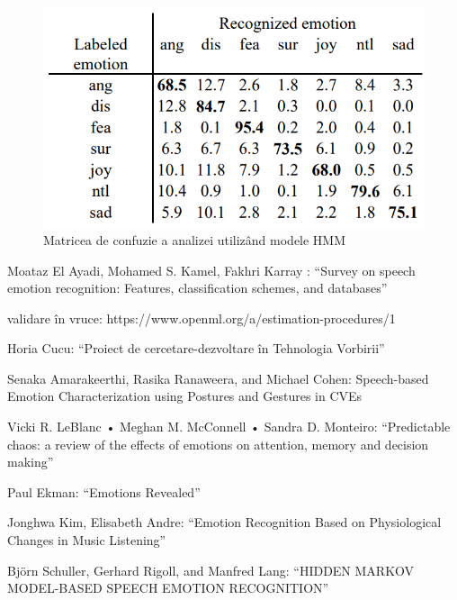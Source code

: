 \documentclass[9pt,shortpaper,twoside,web]{ieeecolor}
\begin{document}
\begin{figure}[htb]
\includegraphics[width=0.9\columnwidth]{res/fig/HMM}
\caption{Matricea de confuzie a analizei utilizând modele HMM \cite{b8}}
\label{fig5}
\end{figure}


\begin{thebibliography}{00}

 Moataz El Ayadi, Mohamed S. Kamel, Fakhri Karray : ``Survey on speech emotion recognition: Features, classification schemes, and databases''

 validare în vruce: https://www.openml.org/a/estimation-procedures/1

 Horia Cucu: ``Proiect de cercetare-dezvoltare în Tehnologia Vorbirii''

 Senaka Amarakeerthi, Rasika Ranaweera, and Michael Cohen: Speech-based Emotion Characterization using Postures and Gestures in CVEs

 Vicki R. LeBlanc • Meghan M. McConnell • Sandra D. Monteiro: ``Predictable chaos: a review of the effects of emotions on attention, memory and decision making''

 Paul Ekman: ``Emotions Revealed''

 Jonghwa Kim, Elisabeth Andre: ``Emotion Recognition Based on Physiological Changes in Music Listening''

 Björn Schuller, Gerhard Rigoll, and Manfred Lang: ``HIDDEN MARKOV MODEL-BASED SPEECH EMOTION RECOGNITION''

\end{thebibliography}
\end{document}
